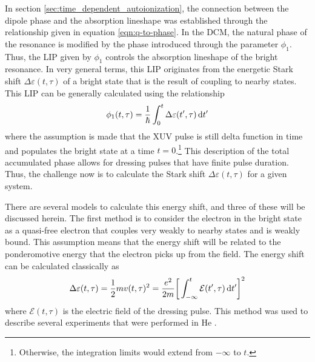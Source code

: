 In section \ref{sec:time_dependent_autoionization}, the connection between the dipole phase and the absorption lineshape was established through the relationship given in equation \ref{eqn:q-to-phase}.  In the DCM, the natural phase of the resonance is modified by the phase introduced through the parameter $\phi_1$.  Thus, the LIP given by $\phi_1$ controls the absorption lineshape of the bright resonance.  In very general terms, this LIP originates from the energetic Stark shift $\Delta\varepsilon(t,\tau)$ of a bright state that is the result of coupling to nearby states.  This LIP can be generally calculated using the relationship
\begin{equation}
	\label{eqn:LIP}
	\phi_{1}(t,\tau) = \frac{1}{\hbar}\int_{0}^{t}\Delta\varepsilon(t',\tau)\mathop{}\!\mathrm{d} t'
\end{equation}
where the assumption is made that the XUV pulse is still delta function in time and populates the bright state at a time $t=0$.\footnote{Otherwise, the integration limits would extend from $-\infty$ to $t$.}  This description of the total accumulated phase allows for dressing pulses that have finite pulse duration.  Thus, the challenge now is to calculate the Stark shift $\Delta\varepsilon(t,\tau)$ for a given system.

There are several models to calculate this energy shift, and three of these will be discussed herein.  The first method is to consider the electron in the bright state as a quasi-free electron that couples very weakly to nearby states and is weakly bound. This assumption means that the energy shift will be related to the ponderomotive energy that the electron picks up from the field.  The energy shift can be calculated classically as
\begin{equation}
	\label{eqn:up_energy_shift}
	\Delta\varepsilon(t,\tau)=\frac{1}{2}m v(t,\tau)^2=\frac{e^2}{2m}\bigg[\int_{-\infty}^{t}\mathcal{E}(t',\tau)\mathop{}\!\mathrm{d} t'\bigg]^2
\end{equation}
where $\mathcal{E}(t,\tau)$ is the electric field of the dressing pulse.  This method was used to describe several experiments that were performed in He \cite{ottLorentzMeetsFano2013, blattermannSituCharacterizationFewcycle2015}.

